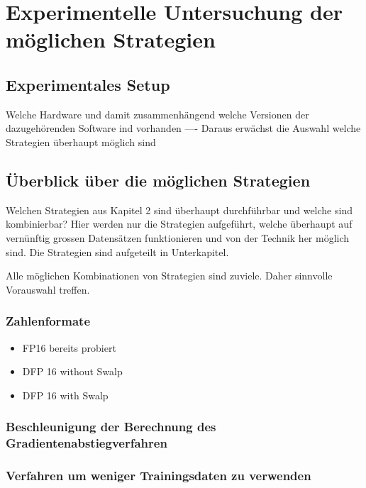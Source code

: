 \chapter{Experimentelle Untersuchung der möglichen Strategien}





\section{Experimentales Setup}

Welche Hardware und damit zusammenhängend welche Versionen der dazugehörenden Software ind vorhanden ---- Daraus erwächst die Auswahl welche Strategien überhaupt möglich sind 


\section{Überblick über die möglichen Strategien}

Welchen Strategien aus Kapitel 2 sind überhaupt durchführbar und welche sind kombinierbar?
Hier werden nur die Strategien aufgeführt, welche überhaupt auf vernünftig grossen Datensätzen funktionieren und von der Technik her möglich sind.
Die Strategien sind aufgeteilt in Unterkapitel. 

Alle möglichen Kombinationen von Strategien sind zuviele. Daher sinnvolle Vorauswahl treffen.  

\subsection{Zahlenformate}

\begin{itemize}
 \item FP16 bereits probiert
 \item DFP 16 without Swalp
 \item DFP 16 with Swalp
\end{itemize}



\subsection{Beschleunigung der Berechnung des Gradientenabstiegverfahren}



\subsection{Verfahren um weniger Trainingsdaten zu verwenden}


